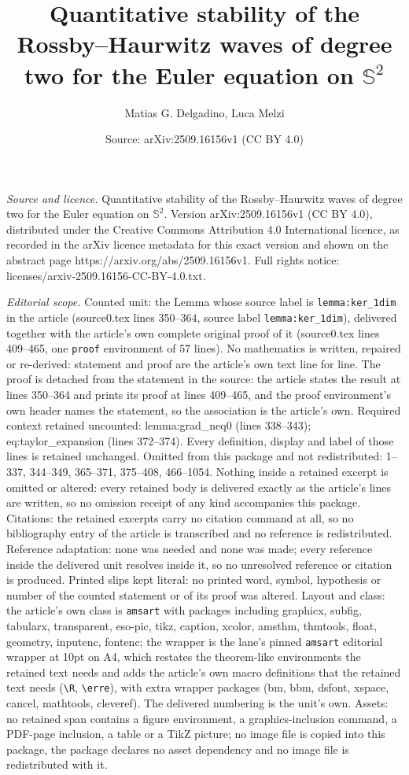 \documentclass[10pt,a4paper]{amsart}
\title[Quantitative stability of the Rossby--Haurwitz waves of degr]{Quantitative stability of the Rossby--Haurwitz waves of degree two for the Euler equation on $\mathbb{S}^2$}
\author{Matias G. Delgadino, Luca Melzi}
\date{Source: arXiv:2509.16156v1 (CC BY 4.0)}
\begin{document}
\maketitle

\noindent\emph{Source and licence.} Quantitative stability of the Rossby--Haurwitz waves of degree two for the Euler equation on $\mathbb{S}^2$. Version arXiv:2509.16156v1 (CC BY 4.0), distributed under the Creative Commons Attribution 4.0 International licence, as recorded in the arXiv licence metadata for this exact version and shown on the abstract page https://arxiv.org/abs/2509.16156v1. Full rights notice: licenses/arxiv-2509.16156-CC-BY-4.0.txt.\par\smallskip

\noindent\textit{Editorial scope.} Counted unit: the Lemma whose source label is \texttt{lemma:ker\_1dim} in the article (source0.tex lines 350--364, source label \texttt{lemma:ker\_1dim}), delivered together with the article's own complete original proof of it (source0.tex lines 409--465, one \texttt{proof} environment of 57 lines). No mathematics is written, repaired or re-derived: statement and proof are the article's own text line for line. The proof is detached from the statement in the source: the article states the result at lines 350--364 and prints its proof at lines 409--465, and the proof environment's own header names the statement, so the association is the article's own. Required context retained uncounted: lemma:grad\_neq0 (lines 338--343); eq:taylor\_expansion (lines 372--374). Every definition, display and label of those lines is retained unchanged. Omitted from this package and not redistributed: 1--337, 344--349, 365--371, 375--408, 466--1054. Nothing inside a retained excerpt is omitted or altered: every retained body is delivered exactly as the article's lines are written, so no omission receipt of any kind accompanies this package. Citations: the retained excerpts carry no citation command at all, so no bibliography entry of the article is transcribed and no reference is redistributed. Reference adaptation: none was needed and none was made; every reference inside the delivered unit resolves inside it, so no unresolved reference or citation is produced. Printed slips kept literal: no printed word, symbol, hypothesis or number of the counted statement or of its proof was altered. Layout and class: the article's own class is \texttt{amsart} with packages including graphicx, subfig, tabularx, transparent, eso-pic, tikz, caption, xcolor, amsthm, thmtools, float, geometry, inputenc, fontenc; the wrapper is the lane's pinned \texttt{amsart} editorial wrapper at 10pt on A4, which restates the theorem-like environments the retained text needs and adds the article's own macro definitions that the retained text needs (\texttt{\textbackslash R}, \texttt{\textbackslash erre}), with extra wrapper packages (bm, bbm, dsfont, xspace, cancel, mathtools, cleveref). The delivered numbering is the unit's own. Assets: no retained span contains a figure environment, a graphics-inclusion command, a PDF-page inclusion, a table or a TikZ picture; no image file is copied into this package, the package declares no asset dependency and no image file is redistributed with it. 
\end{document}
